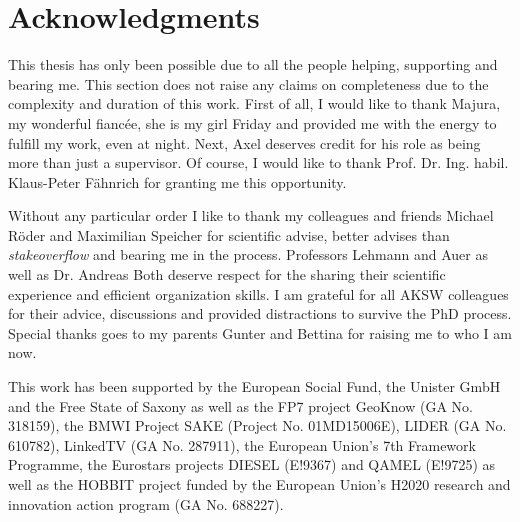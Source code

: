 



\bigskip

\begingroup
\let\clearpage\relax
\let\cleardoublepage\relax
\let\cleardoublepage\relax
\chapter*{Acknowledgments}
This thesis has only been possible due to all the people helping, supporting and bearing me.
This section does not raise any claims on completeness due to the complexity and duration of this work.
First of all, I would like to thank Majura, my wonderful fiancée, she is my girl Friday and provided me with the energy to fulfill my work, even at night.
Next, Axel deserves credit for his role as being more than just a supervisor. 
Of course, I would like to thank Prof. Dr. Ing. habil. Klaus-Peter F\"ahnrich for granting me this opportunity.
 
\bigskip

Without any particular order I like to thank my colleagues and friends Michael Röder and Maximilian Speicher for scientific advise, better advises than \emph{stakeoverflow} and bearing me in the process. 
Professors Lehmann and Auer as well as Dr. Andreas Both deserve respect for the sharing their scientific experience and efficient organization skills. 
I am grateful for all AKSW colleagues for their advice, discussions and provided distractions to survive the PhD process. 
Special thanks goes to my parents Gunter and Bettina for raising me to who I am now. 


\bigskip


This work has been supported by the European Social Fund, the Unister GmbH and the Free State of Saxony as well as the FP7 project GeoKnow (GA No. 318159), the BMWI Project SAKE (Project No. 01MD15006E), LIDER (GA No. 610782), LinkedTV (GA No. 287911), the European Union's 7th Framework Programme, the Eurostars projects DIESEL (E!9367) and QAMEL (E!9725) as well as the HOBBIT project funded by the European Union's H2020 research and innovation action program (GA No. 688227).


\endgroup




